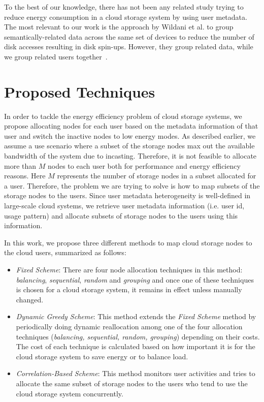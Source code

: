 \documentclass[preprint,12pt]{elsarticle}
\begin{document}
To the best of our knowledge, there has not been any related study trying to reduce energy consumption in 
a cloud storage system by using user metadata. The most relevant to our work is the approach by Wildani et al.
to group semantically-related data across the same set of devices to reduce the number of disk accesses resulting
in disk spin-ups. However, they group related data, while we group related users together~\cite{5668053}.


\section{Proposed Techniques}
\label{methods}
In order to tackle the energy efficiency problem of cloud storage systems, we propose
allocating nodes for each user based on the metadata information of that user
and switch the inactive nodes to low energy modes. As described earlier, we assume
a use scenario where a subset of the storage nodes max out the
available bandwidth of the system due to incasting. Therefore, it is not feasible to allocate more
than $M$ nodes to each user both for performance and energy efficiency reasons. Here $M$
represents the number of storage nodes in a subset allocated for a user. Therefore,
the problem we are trying to solve is how to map subsets of the storage nodes to the users.
Since user metadata heterogeneity is well-defined in large-scale cloud systems, we
retrieve user metadata information (i.e. user id, usage pattern) and
allocate subsets of storage nodes to the users using this information.

In this work, we propose three different methods to map cloud storage nodes to the
cloud users, summarized as follows:

\begin{itemize}
\item \textit{Fixed Scheme}: There
are four node allocation techniques in this method: \textit{balancing}, \textit{sequential},
\textit{random} and \textit{grouping} and once one of these techniques is chosen for a
cloud storage system, it remains in effect unless manually changed.
\item \textit{Dynamic Greedy Scheme}: This method
extends the \textit{Fixed Scheme} method by periodically doing dynamic reallocation
among one of the four
allocation techniques (\textit{balancing, sequential, random, grouping}) depending
on their costs. The cost of each technique is calculated based on how important it is
for the cloud storage system to save energy or to balance load.
\item \textit{Correlation-Based Scheme}: This method
monitors user activities and tries to allocate the same subset of storage nodes to the
users who tend to use the cloud storage system concurrently.
\end{itemize}
\end{document}
